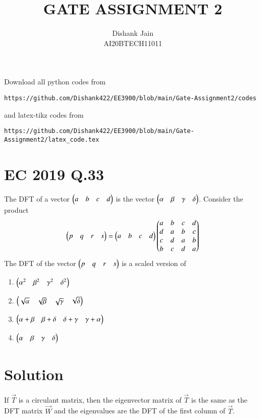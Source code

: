 \documentclass[journal,12pt,twocolumn]{IEEEtran}
\begin{document}
     \def\centbox#1{\makebox[0in]{#1}}
     \def\topbox#1{\raisebox{-\baselineskip}[0in][0in]{#1}}
     \def\midbox#1{\raisebox{-0.5\baselineskip}[0in][0in]{#1}}
\vspace{3cm}
\title{GATE ASSIGNMENT 2}
\author{Dishank Jain \\ AI20BTECH11011}
\maketitle
\newpage
\bigskip
\renewcommand{\thefigure}{\theenumi}
\renewcommand{\thetable}{\theenumi}
Download all python codes from 
%
\begin{lstlisting}
https://github.com/Dishank422/EE3900/blob/main/Gate-Assignment2/codes
\end{lstlisting}
%
and latex-tikz codes from
%
\begin{lstlisting}
https://github.com/Dishank422/EE3900/blob/main/Gate-Assignment2/latex_code.tex
\end{lstlisting}
%
\section{EC 2019 Q.33}
The DFT of a vector $\begin{pmatrix}a & b & c & d\end{pmatrix}$ is the vector $\begin{pmatrix}\alpha & \beta & \gamma & \delta\end{pmatrix}$. Consider the product 
\begin{equation}
    \begin{pmatrix}p & q & r & s\end{pmatrix} = \begin{pmatrix}a & b & c & d\end{pmatrix}\begin{pmatrix}a & b & c & d\\ d & a & b & c\\ c & d & a & b\\b & c & d &a\end{pmatrix}
\end{equation}
The DFT of the vector $\begin{pmatrix}p & q & r & s\end{pmatrix}$ is a scaled version of 
\begin{enumerate}[label = (\Alph*)]
    \item $\begin{pmatrix}\alpha^2 & \beta ^2 & \gamma^2 & \delta^2\end{pmatrix}$
    \item $\begin{pmatrix}\sqrt{\alpha} & \sqrt{\beta} & \sqrt{\gamma} & \sqrt{\delta}\end{pmatrix}$
    \item $\begin{pmatrix}\alpha+\beta & \beta+\delta & \delta+\gamma & \gamma+\alpha\end{pmatrix}$
    \item $\begin{pmatrix}\alpha & \beta & \gamma & \delta\end{pmatrix}$
\end{enumerate}

\section{Solution}
\begin{lemma}
If $\vec{T}$ is a circulant matrix, then the eigenvector matrix of $\vec{T}$ is the same as the DFT matrix $\vec{W}$ and the eigenvalues are the DFT of the first column of $\vec{T}$.
\end{lemma}
\end{document}
